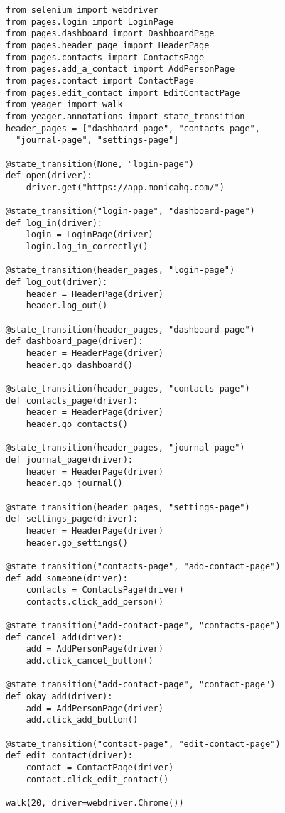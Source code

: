 \begin{Verbatim}[fontsize=\small, baselinestretch=0.75]
from selenium import webdriver
from pages.login import LoginPage
from pages.dashboard import DashboardPage
from pages.header_page import HeaderPage
from pages.contacts import ContactsPage
from pages.add_a_contact import AddPersonPage
from pages.contact import ContactPage
from pages.edit_contact import EditContactPage
from yeager import walk
from yeager.annotations import state_transition
header_pages = ["dashboard-page", "contacts-page",
  "journal-page", "settings-page"]

@state_transition(None, "login-page")
def open(driver):
    driver.get("https://app.monicahq.com/")

@state_transition("login-page", "dashboard-page")
def log_in(driver):
    login = LoginPage(driver)
    login.log_in_correctly()

@state_transition(header_pages, "login-page")
def log_out(driver):
    header = HeaderPage(driver)
    header.log_out()

@state_transition(header_pages, "dashboard-page")
def dashboard_page(driver):
    header = HeaderPage(driver)
    header.go_dashboard()

@state_transition(header_pages, "contacts-page")
def contacts_page(driver):
    header = HeaderPage(driver)
    header.go_contacts()

@state_transition(header_pages, "journal-page")
def journal_page(driver):
    header = HeaderPage(driver)
    header.go_journal()

@state_transition(header_pages, "settings-page")
def settings_page(driver):
    header = HeaderPage(driver)
    header.go_settings()

@state_transition("contacts-page", "add-contact-page")
def add_someone(driver):
    contacts = ContactsPage(driver)
    contacts.click_add_person()

@state_transition("add-contact-page", "contacts-page")
def cancel_add(driver):
    add = AddPersonPage(driver)
    add.click_cancel_button()

@state_transition("add-contact-page", "contact-page")
def okay_add(driver):
    add = AddPersonPage(driver)
    add.click_add_button()

@state_transition("contact-page", "edit-contact-page")
def edit_contact(driver):
    contact = ContactPage(driver)
    contact.click_edit_contact()

walk(20, driver=webdriver.Chrome())

\end{Verbatim}

